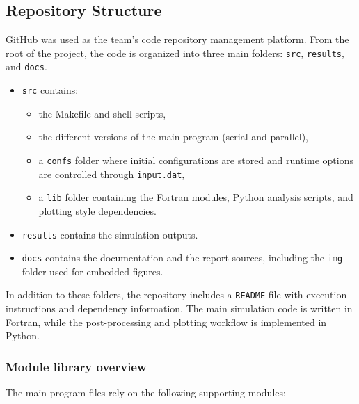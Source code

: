 \subsection{Repository Structure}\label{repository-structure}

GitHub was used as the team's code repository management platform. From the root of
\href{https://github.com/Eines-Informatiques-Avancades/Project_2026_II}{the project},
the code is organized into three main folders: \texttt{src}, \texttt{results}, and \texttt{docs}.

\begin{itemize}
  \item \texttt{src} contains:
  \begin{itemize}
    \item the Makefile and shell scripts,
    \item the different versions of the main program (serial and parallel),
    \item a \texttt{confs} folder where initial configurations are stored and runtime options are controlled through \texttt{input.dat},
    \item a \texttt{lib} folder containing the Fortran modules, Python analysis scripts, and plotting style dependencies.
  \end{itemize}
  \item \texttt{results} contains the simulation outputs.
  \item \texttt{docs} contains the documentation and the report sources, including the \texttt{img} folder used for embedded figures.
\end{itemize}

In addition to these folders, the repository includes a \texttt{README} file with execution instructions and dependency information. The main simulation code is written in Fortran, while the post-processing and plotting workflow is implemented in Python.

\subsubsection{Module library overview}

The main program files rely on the following supporting modules:

